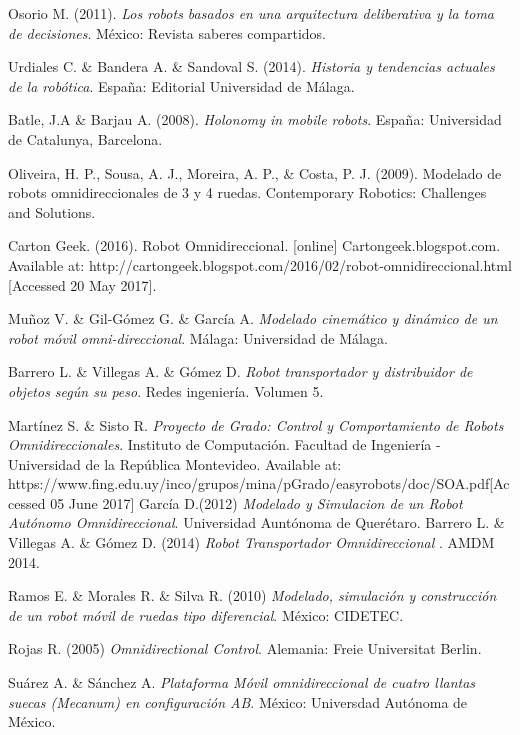 \documentclass[12pt,letterpaper]{report} %
\begin{document}
\renewcommand{\refname}{Bibliografía}
\begin{thebibliography}{}

 Osorio M. (2011). \emph{Los robots basados en una arquitectura deliberativa y la toma de decisiones}. México: Revista saberes compartidos.

 Urdiales C. \& Bandera A. \& Sandoval S. (2014). \emph{Historia y tendencias actuales de la robótica}. España: Editorial Universidad de Málaga.

 Batle, J.A \& Barjau A. (2008). \emph{Holonomy in mobile robots}. España: Universidad de Catalunya, Barcelona. 

 Oliveira, H. P., Sousa, A. J., Moreira, A. P., \& Costa, P. J. (2009). Modelado de robots omnidireccionales de 3 y 4 ruedas. Contemporary Robotics: Challenges and Solutions.

 Carton Geek. (2016). Robot Omnidireccional. [online] Cartongeek.blogspot.com. Available at: http://cartongeek.blogspot.com/2016/02/robot-omnidireccional.html [Accessed 20 May 2017].

 Muñoz V. \& Gil-Gómez G. \& García A. \emph{Modelado cinemático y dinámico de un robot móvil omni-direccional}. Málaga: Universidad de Málaga.

 Barrero L. \& Villegas A. \& Gómez D.
\emph{Robot transportador y distribuidor de objetos según su peso}. Redes ingeniería. Volumen 5.


 Martínez S. \& Sisto R. \emph{Proyecto de Grado: Control y Comportamiento de Robots Omnidireccionales}. Instituto de Computación. Facultad de Ingeniería - Universidad de la República
Montevideo. Available at: https://www.fing.edu.uy/inco/grupos/mina/pGrado/easyrobots/doc/SOA.pdf[Accessed 05 June 2017]
 García D.(2012) 
\emph{Modelado y Simulacion de un Robot Autónomo Omnidireccional}. Universidad Auntónoma de Querétaro. 
 Barrero L. \& Villegas A. \& Gómez D. (2014)
\emph{Robot Transportador Omnidireccional }. AMDM 2014.

 Ramos E. \& Morales R. \& Silva R. (2010) \emph{Modelado, simulación y construcción de un robot móvil de ruedas tipo diferencial}. México: CIDETEC.

 Rojas R. (2005) \emph{Omnidirectional Control}. Alemania: Freie Universitat Berlin.

 Suárez A. \& Sánchez A. \emph{Plataforma Móvil omnidireccional de cuatro llantas suecas (Mecanum) en configuración AB}.  México: Universdad Autónoma de México.


\end{thebibliography}
\end{document}
